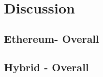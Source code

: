 \chapter{Discussion}\label{chapter:discussion}
\section{Ethereum- Overall}\label{sec:}
\section{Hybrid - Overall}\label{sec:}
